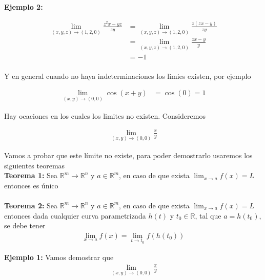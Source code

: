 \documentclass{article}
\theoremstyle{definition}
\begin{document}
\newpage


\textbf{Ejemplo 2: } 

\begin{align*}
\displaystyle \lim_{(x,y,z) \to (1,2,0)} \frac{z^2x-yz}{zy} &= \lim_{(x,y,z) \to (1,2,0)} \frac{z(zx-y)}{zy}\\
&= \lim_{(x,y,z) \to (1,2,0)} \frac{zx-y}{y}\\
&=  -1\\
\end{align*}



Y en general cuando no haya indeterminaciones los limies existen, por ejemplo




\begin{align*}
\displaystyle \lim_{(x,y) \to (0,0)} \cos(x+y)&= \cos(0) =1
\end{align*}



Hay ocaciones en los cuales los limites no existen. Consideremos

\begin{align*}
\displaystyle \lim_{(x,y) \to (0,0)}  \frac{x}{y} 
\end{align*}

Vamos a probar que este l\'imite no existe, para poder demostrarlo usaremos los siguientes teoremas \\ 



\textbf{Teorema 1: } Sea $\mathbb{R}^m \to \mathbb{R}^n$ y $a \in \mathbb{R}^m$, en caso de que exista $\displaystyle \lim_{x \to a} f(x) = L$ entonces es único \\ \\




\textbf{Teorema 2: } Sea $\mathbb{R}^m \to \mathbb{R}^n$ y $a \in \mathbb{R}^m$, en caso de que exista $\displaystyle \lim_{x \to a} f(x) = L$ entonces dada cualquier curva parametrizada $h(t)$ y $t_0 \in \mathbb{R}$, tal que $ a=h(t_0) $, se debe tener \\


\begin{align*}
\displaystyle \lim_{x \to a} f(x) = \lim_{t \to t_0} f(h(t_0)) 
\end{align*}


\textbf{Ejemplo 1: } Vamos demostrar que \\


\begin{align*}
\displaystyle \lim_{(x,y) \to (0,0)}  \frac{x}{y} 
\end{align*}
\end{document}
